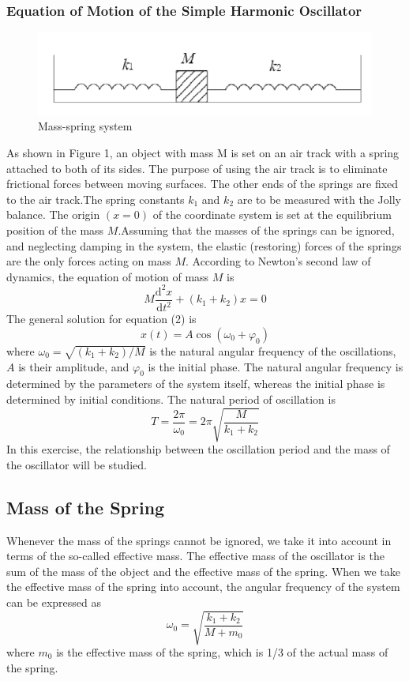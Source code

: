 \documentclass[12pt]{article}
\begin{document}
\subsubsection{Equation of Motion of the Simple Harmonic Oscillator}
\begin{figure}[H]
\centering
\includegraphics[]{P1.jpg}
\caption{Mass-spring system}
\end{figure}
As shown in Figure 1, an object with mass M is set on an air track with a spring
attached to both of its sides. The purpose of using the air track is to eliminate frictional forces between moving surfaces. The other ends of the springs are fixed to the air track.The spring constants $k_1$ and $k_2$ are to be measured with the Jolly balance. The origin $(x=0)$ of the coordinate system is set at the equilibrium position of the mass $M$.Assuming that the masses of the springs can be ignored, and neglecting damping in the system, the elastic (restoring) forces of the springs are the only forces acting on mass $M$. According to Newton's second law of dynamics, the equation of motion of mass $M$ is
\begin{equation}
M\frac{\mathrm{d}^2x}{\mathrm{d}t^2}+(k_1+k_2)x=0
\end{equation}
The general solution for equation (2) is
\begin{equation}
x(t)=A\cos(\omega_0+\varphi_0) 
\end{equation}
where $\omega_0=\sqrt{(k_1+k_2)/M}$ is the natural angular frequency of the oscillations, $A$ is their amplitude, and $\varphi_0$ is the initial phase. The natural angular frequency is determined by the parameters of the system itself, whereas the initial phase is determined by initial conditions. The natural period of oscillation is 
\begin{equation}
T=\frac{2\pi}{\omega_0}=2\pi\sqrt{\frac{M}{k_1+k_2}}
\end{equation} 
In this exercise, the relationship between the oscillation period and the mass of the oscillator will be studied.
\subsection{Mass of the Spring}
Whenever the mass of the springs cannot be ignored, we take it into account in terms
of the so-called effective mass. The effective mass of the oscillator is the sum of the mass of the object and the effective mass of the spring. When we take the effective mass of the spring into account, the angular frequency of the system can be expressed as
\begin{equation}
\omega_0=\sqrt{\frac{k_1+k_2}{M+m_0}}
\end{equation}
where $m_0$ is the effective mass of the spring, which is 1/3 of the actual mass of the spring.
\end{document}
